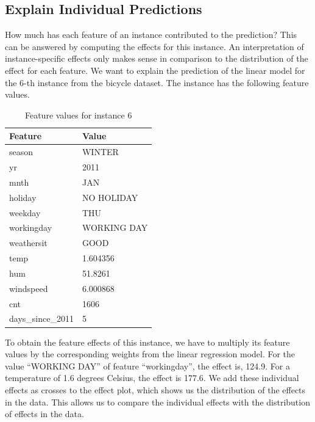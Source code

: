 \documentclass[
  11pt,
]{scrbook}
\begin{document}
\hypertarget{explain-individual-predictions}{%
\subsection{Explain Individual Predictions}\label{explain-individual-predictions}}

How much has each feature of an instance contributed to the prediction?
This can be answered by computing the effects for this instance.
An interpretation of instance-specific effects only makes sense in comparison to the distribution of the effect for each feature.
We want to explain the prediction of the linear model for the 6-th instance from the bicycle dataset.
The instance has the following feature values.

\begin{table}

\caption{\label{tab:linear-effects-single-table}Feature values for instance 6}
\centering
\begin{tabular}[t]{ll}
\toprule
Feature & Value\\
\midrule
season & WINTER\\
yr & 2011\\
mnth & JAN\\
holiday & NO HOLIDAY\\
weekday & THU\\
\addlinespace
workingday & WORKING DAY\\
weathersit & GOOD\\
temp & 1.604356\\
hum & 51.8261\\
windspeed & 6.000868\\
\addlinespace
cnt & 1606\\
days\_since\_2011 & 5\\
\bottomrule
\end{tabular}
\end{table}

To obtain the feature effects of this instance, we have to multiply its feature values by the corresponding weights from the linear regression model.
For the value ``WORKING DAY'' of feature ``workingday'', the effect is, 124.9.
For a temperature of 1.6 degrees Celsius, the effect is 177.6.
We add these individual effects as crosses to the effect plot, which shows us the distribution of the effects in the data.
This allows us to compare the individual effects with the distribution of effects in the data.
\end{document}
